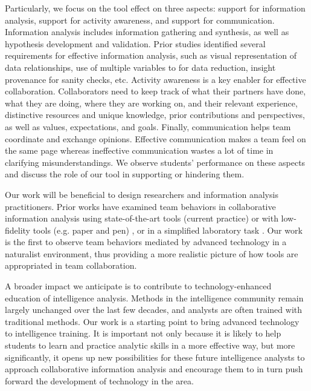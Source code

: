 Particularly, we focus on the tool effect on three aspects: support for information analysis, support for activity awareness, and support for communication. Information analysis includes information gathering and synthesis, as well as hypothesis development and validation. Prior studies \cite{Chin2009,Kang2011,Borge2012} identified several requirements for effective information analysis, such as visual representation of data relationships, use of multiple variables to for data reduction, insight provenance for sanity checks, etc. Activity awareness \cite{Carroll2003} is a key enabler for effective collaboration. Collaborators need to keep track of what their partners have done, what they are doing, where they are working on, and their relevant experience, distinctive resources and unique knowledge, prior contributions and perspectives, as well as values, expectations, and goals. Finally, communication helps team coordinate and exchange opinions. Effective communication makes a team feel on the same page whereas ineffective communication wastes a lot of time in clarifying misunderstandings. We observe students' performance on these aspects and discuss the role of our tool in supporting or hindering them. 

Our work will be beneficial to design researchers and information analysis practitioners. Prior works have examined team behaviors in collaborative information analysis using state-of-the-art tools (current practice) \cite{Kang2011,Chin2009} or with low-fidelity tools (e.g. paper and pen) \cite{Borge2012}, or in a simplified laboratory task \cite{Goyal2016}. Our work is the first to observe team behaviors mediated by advanced technology in a naturalist environment, thus providing a more realistic picture of how tools are appropriated in team collaboration. 

A broader impact we anticipate is to contribute to technology-enhanced education of intelligence analysis. Methods in the intelligence community remain largely unchanged over the last few decades, and analysts are often trained with traditional methods. Our work is a starting point to bring advanced technology to intelligence training. It is important not only because it is likely to help students to learn and practice analytic skills in a more effective way, but more significantly, it opens up new possibilities for these future intelligence analysts to approach collaborative information analysis and encourage them to in turn push forward the development of technology in the area. 


